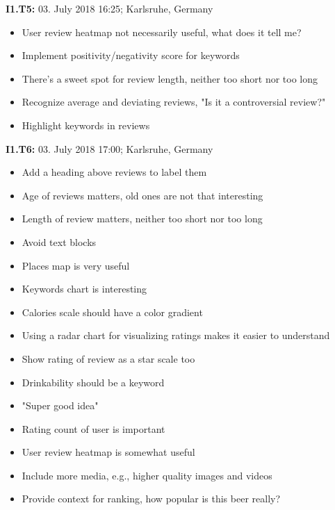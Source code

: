 \hfill

\begin{flushleft}
    \textbf{I1.T5:} 03. July 2018 16:25; Karlsruhe, Germany
    \begin{itemize}
        \item User review heatmap not necessarily useful, what does it tell me?
        \item Implement positivity/negativity score for keywords
        \item There's a sweet spot for review length, neither too short nor too long
        \item Recognize average and deviating reviews, "Is it a controversial review?"
        \item Highlight keywords in reviews
    \end{itemize}
\end{flushleft}

\hfill

\begin{flushleft}
    \textbf{I1.T6:} 03. July 2018 17:00; Karlsruhe, Germany
    \begin{itemize}
        \item Add a heading above reviews to label them
        \item Age of reviews matters, old ones are not that interesting
        \item Length of review matters, neither too short nor too long
        \item Avoid text blocks
        \item Places map is very useful
        \item Keywords chart is interesting
        \item Calories scale should have a color gradient
        \item Using a radar chart for visualizing ratings makes it easier to understand
        \item Show rating of review as a star scale too
        \item Drinkability should be a keyword
        \item "Super good idea"
        \item Rating count of user is important
        \item User review heatmap is somewhat useful
        \item Include more media, e.g., higher quality images and videos
        \item Provide context for ranking, how popular is this beer really?
    \end{itemize}
\end{flushleft}


